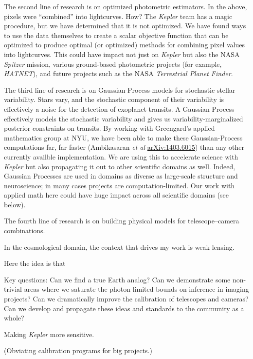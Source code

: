 \documentclass[11pt, letterpaper]{article}
\newcommand{\arxiv}[1]{\href{http://arxiv.org/abs/#1}{arXiv:#1}}
\begin{document}
The second line of research is on optimized photometric estimators.
In the above, pixels were ``combined'' into lightcurves.
How?
The \textsl{Kepler} team has a magic procedure, but we have determined
that it is not optimized.
We have found ways to use the data themselves to create a scalar
objective function that can be optimized to produce optimal (or
optimized) methods for combining pixel values into lightcurves.
This could have impact not just on \textsl{Kepler} but also the NASA
\textsl{Spitzer} mission, various ground-based photometric projects
(for example, \textsl{HATNET}), and future projects such as the NASA
\textsl{Terrestrial Planet Finder}.

The third line of research is on Gaussian-Process models for
stochastic stellar variability.
Stars vary, and the stochastic component of their variability is
effectively a noise for the detection of exoplanet transits.
A Gaussian Process effectively models the stochastic variability and
gives us variability-marginalized posterior constraints on transits.
By working with Greengard's applied mathematics group at NYU, we have
been able to make these Gaussian-Process computations far, far faster
(Ambikasaran \textit{et al} \arxiv{1403.6015})
than any other currently availble implementation.
We are using this to accelerate science with \textsl{Kepler} but also
propagating it out to other scientific domains as well.
Indeed, Gaussian Processes are used in domains as diverse as
large-scale structure and neuroscience; in many cases projects are
computation-limited.
Our work with applied math here could have huge impact across all
scientific domains (see below).

The fourth line of research is on building physical models for
telescope--camera combinations.



In the cosmological domain, the context that drives my work is weak
lensing.

Here the idea is that 


Key questions: Can we find a true Earth analog?  Can we demonstrate
some non-trivial areas where we saturate the photon-limited bounds on
inference in imaging projects?  Can we dramatically improve the
calibration of telescopes and cameras?  Can we develop and propagate
these ideas and standards to the community as a whole?

Making \textsl{Kepler} more sensitive.

(Obviating calibration programs for big projects.)
\end{document}
